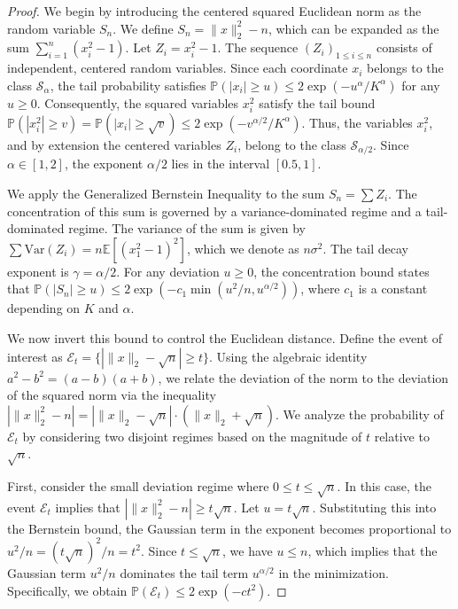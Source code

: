 \documentclass[11pt]{amsart}
\theoremstyle{definition}
\theoremstyle{remark}
\begin{document}
\begin{proof}
We begin by introducing the centered squared Euclidean norm as the random variable $S_n$. We define $S_n = \|x\|_2^2 - n$, which can be expanded as the sum $\sum_{i=1}^n (x_i^2 - 1)$. Let $Z_i = x_i^2 - 1$. The sequence $(Z_i)_{1 \leq i \leq n}$ consists of independent, centered random variables. Since each coordinate $x_i$ belongs to the class $\mathcal{S}_\alpha$, the tail probability satisfies $\mathbb{P}(|x_i| \geq u) \leq 2 \exp(-u^\alpha / K^\alpha)$ for any $u \geq 0$. Consequently, the squared variables $x_i^2$ satisfy the tail bound $\mathbb{P}(|x_i^2| \geq v) = \mathbb{P}(|x_i| \geq \sqrt{v}) \leq 2 \exp(-v^{\alpha/2} / K^\alpha)$. Thus, the variables $x_i^2$, and by extension the centered variables $Z_i$, belong to the class $\mathcal{S}_{\alpha/2}$. Since $\alpha \in [1, 2]$, the exponent $\alpha/2$ lies in the interval $[0.5, 1]$.

We apply the Generalized Bernstein Inequality to the sum $S_n = \sum Z_i$. The concentration of this sum is governed by a variance-dominated regime and a tail-dominated regime. The variance of the sum is given by $\sum \text{Var}(Z_i) = n \mathbb{E}[(x_1^2-1)^2]$, which we denote as $n \sigma^2$. The tail decay exponent is $\gamma = \alpha/2$. For any deviation $u \geq 0$, the concentration bound states that $\mathbb{P}(|S_n| \geq u) \leq 2 \exp( -c_1 \min( u^2/n, u^{\alpha/2} ) )$, where $c_1$ is a constant depending on $K$ and $\alpha$.

We now invert this bound to control the Euclidean distance. Define the event of interest as $\mathcal{E}_t = \{ | \|x\|_2 - \sqrt{n} | \geq t \}$. Using the algebraic identity $a^2 - b^2 = (a-b)(a+b)$, we relate the deviation of the norm to the deviation of the squared norm via the inequality $| \|x\|_2^2 - n | = | \|x\|_2 - \sqrt{n} | \cdot ( \|x\|_2 + \sqrt{n} )$. We analyze the probability of $\mathcal{E}_t$ by considering two disjoint regimes based on the magnitude of $t$ relative to $\sqrt{n}$.

First, consider the small deviation regime where $0 \leq t \leq \sqrt{n}$. In this case, the event $\mathcal{E}_t$ implies that $| \|x\|_2^2 - n | \geq t \sqrt{n}$. Let $u = t\sqrt{n}$. Substituting this into the Bernstein bound, the Gaussian term in the exponent becomes proportional to $u^2/n = (t\sqrt{n})^2/n = t^2$. Since $t \leq \sqrt{n}$, we have $u \leq n$, which implies that the Gaussian term $u^2/n$ dominates the tail term $u^{\alpha/2}$ in the minimization. Specifically, we obtain $\mathbb{P}(\mathcal{E}_t) \leq 2 \exp(-c t^2)$.


\end{proof}
\end{document}
